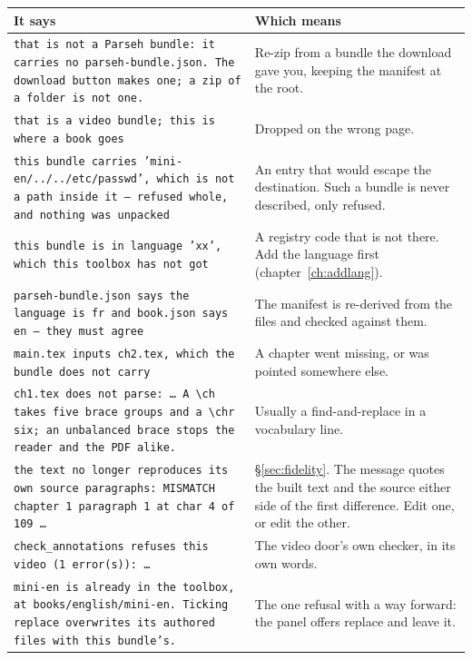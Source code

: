 \documentclass[11pt,oneside]{report}
\newcommand{\menu}[1]{\textsf{#1}}
\begin{document}
\begin{center}
\begin{longtable}{@{}p{}p{}@{}}
\toprule
\textsf{It says} & \textsf{Which means} \\
\midrule
\texttt{that is not a Parseh bundle: it carries no parseh-bundle.json. The
download button makes one; a zip of a folder is not one.} &
  Re-zip from a bundle the download gave you, keeping the manifest at the
  root. \\
\addlinespace
\texttt{that is a video bundle; this is where a book goes} &
  Dropped on the wrong page. \\
\addlinespace
\texttt{this bundle carries 'mini-en/../../etc/passwd', which is not a path
inside it --- refused whole, and nothing was unpacked} &
  An entry that would escape the destination. Such a bundle is never
  described, only refused. \\
\addlinespace
\texttt{this bundle is in language 'xx', which this toolbox has not got} &
  A registry code that is not there. Add the language first
  (chapter~\ref{ch:addlang}). \\
\addlinespace
\texttt{parseh-bundle.json says the language is fr and book.json says en ---
they must agree} &
  The manifest is re-derived from the files and checked against them. \\
\addlinespace
\texttt{main.tex inputs ch2.tex, which the bundle does not carry} &
  A chapter went missing, or \verb|| was pointed somewhere else. \\
\addlinespace
\texttt{ch1.tex does not parse: \ldots{} A \textbackslash ch takes five brace
groups and a \textbackslash chr six; an unbalanced brace stops the reader and
the PDF alike.} &
  Usually a find-and-replace in a vocabulary line. \\
\addlinespace
\texttt{the text no longer reproduces its own source paragraphs: MISMATCH
chapter 1 paragraph 1 at char 4 of 109 \ldots} &
  \S\ref{sec:fidelity}. The message quotes the built text and the source
  either side of the first difference. Edit one, or edit the other. \\
\addlinespace
\texttt{check\_annotations refuses this video (1 error(s)): \ldots} &
  The video door's own checker, in its own words. \\
\addlinespace
\texttt{mini-en is already in the toolbox, at books/english/mini-en. Ticking
replace overwrites its authored files with this bundle's.} &
  The one refusal with a way forward: the panel offers \menu{replace} and
  \menu{leave it}. \\
\bottomrule
\end{longtable}
\end{center}
\end{document}
